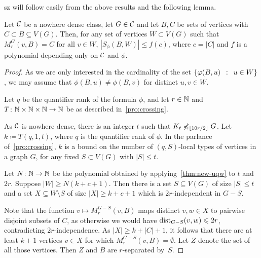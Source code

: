 \begin{change}{sz}
	 will follow easily from the above results and the following lemma.
\begin{lemma}\label{lem:num-types-same-class}
 Let $\mathcal{C}$ be a nowhere dense class,
let $G\in\mathcal{C}$ and let $B,C$ be sets of vertices with
$C\subset B\subseteq V(G)$.
Then, for any set of vertices $W\subset V(G)$ such that 
$M_r^G(v,B)=C$ for all $v\in W$, 
 $|S_\phi(B,W)|\le f(c)$, where $c=|C|$ and $f$ is a polynomial depending only on $\mathcal{C}$ and $\phi$.
\end{lemma}

\begin{proof}
As we are only interested in the cardinality of the set $\left\{\varphi(B,u) \,~:~\, u\in W \right\}$,
we may assume  that $\phi(B,u)\neq \phi(B,v)$ 
for distinct $u, v\in W$.


Let $q$ be the quantifier rank of the formula $\phi$,
and let $r\in \mathbb{N}$ and~$T\colon \mathbb{N}\times \mathbb{N}\times \mathbb{N}\to \mathbb{N}$  
be as described in~\cref{pro:crossing}.

As $\mathcal{C}$ is nowhere dense, there is an integer $t$ such that 
$K_t\not\preccurlyeq_{\lfloor 10r/2\rfloor} G$. 
Let $k\coloneqq T(q,1,t)$, where $q$ is the quantifier rank of $\phi$. In the parlance of~\cref{pro:crossing},
$k$ is a bound on the number of $(q,S)$-local types of vertices in a graph $G$,
for any fixed $S\subset V(G)$ with $|S|\le t$.



Let  $N\colon \mathbb{N}\to \mathbb{N}$ be the polynomial obtained by applying~\cref{thm:new-uqw} to $t$ and $2r$.
Suppose   $|W|\geq N(k+c+1)$. Then there is a  
set $S\subseteq V(G)$ of size $|S|\leq t$ 
and a set $X\subseteq W\setminus S$ of size $|X|\geq k+c+1$ which is 
$2r$-independent in $G-S$. 

Note that the function
 $v\mapsto M_r^{G-S}(v,B)$ 
 maps distinct $v,w\in X$ to pairwise disjoint subsets of $C$,
as otherwise we would have $\mathrm{dist}_{G-S}(v,w)\leqslant 2r$,
contradicting $2r$-independence.
As  $|X|\ge k+|C|+1$, it follows that 
there are at least $k+1$ vertices $v\in X$
for which ${M_r^{G-S}(v,B)=\emptyset}$. Let $Z$ denote the set of all those vertices. Then $Z$ and $B$ are $r$-separated by~$S$.



\end{proof}
\end{change}
